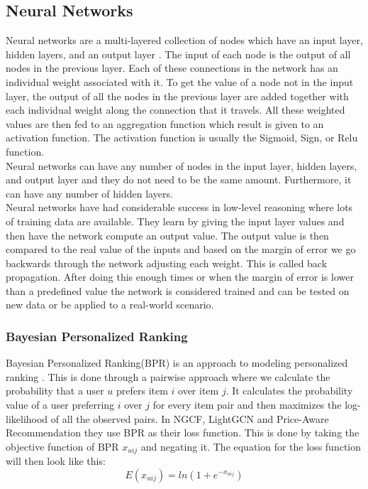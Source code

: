 \subsection{Neural Networks}
Neural networks are a multi-layered collection of nodes which have an input layer, hidden layers, and an output layer \cite{AI-book}.
The input of each node is the output of all nodes in the previous layer.
Each of these connections in the network has an individual weight associated with it.
To get the value of a node not in the input layer, the output of all the nodes in the previous layer are added together with each individual weight along the connection that it travels.
All these weighted values are then fed to an aggregation function which result is given to an activation function.
The activation function is usually the Sigmoid, Sign, or Relu function.
\\
Neural networks can have any number of nodes in the input layer, hidden layers, and output layer and they do not need to be the same amount.
Furthermore, it can have any number of hidden layers.
\\
Neural networks have had considerable success in low-level reasoning where lots of training data are available.
They learn by giving the input layer values and then have the network compute an output value.
The output value is then compared to the real value of the inputs and based on the margin of error we go backwards through the network adjusting each weight.
This is called back propagation.
After doing this enough times or when the margin of error is lower than a predefined value the network is considered trained and can be tested on new data or be applied to a real-world scenario.

\subsubsection{Bayesian Personalized Ranking}
Bayesian Personalized Ranking(BPR) is an approach to modeling personalized ranking \cite{BPR}.
This is done through a pairwise approach where we calculate the probability that a user $u$ prefers item $i$ over item $j$.
It calculates the probability value of a user preferring $i$ over $j$ for every item pair and then maximizes the log-likelihood of all the observed pairs.
In NGCF, LightGCN and Price-Aware Recommendation they use BPR as their loss function.
This is done by taking the objective function of BPR $x_{uij}$ and negating it.
The equation for the loss function will then look like this:
\[E(x_{uij}) = ln(1+e^{-x_{uij}})\]

